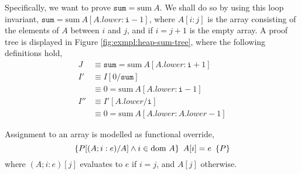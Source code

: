 \begin{example}
  Specifically, we want to prove $\mathtt{sum} = \mathrm{sum}~A$. We
  shall do so by using this loop invariant, $\mathtt{sum} =
  \mathrm{sum}~A[A.lower : \mathtt{i} - 1]$, where $A[i:j]$ is the
  array consisting of the elements of $A$ between $i$ and $j$, and if
  $i = j + 1$ is the empty array. A proof tree is displayed in Figure
  \ref{fig:exmpl:heap-sum-tree}, where the following definitions hold,
  \begin{align*}
    J &\equiv \mathtt{sum} = \mathrm{sum}~A[A.lower : \mathtt{i} + 1]\\
    I' &\equiv I[0/\mathtt{sum}]\\
    &\equiv 0 = \mathrm{sum}~A[A.lower : \mathtt{i} - 1]\\
    I'' &\equiv I'[A.lower/\mathtt{i}]\\
    &\equiv 0 = \mathrm{sum}~A[A.lower : A.lower - 1]
  \end{align*}
\end{example}

\begin{definition}
  Assignment to an array is modelled as functional override,
  \[\left\{P[(A; i : e)/A] \land i \in \mathrm{dom}~A\right\}\ A[i] = e\ \left\{P\right\}\]
  where $(A; i : e)[j]$ evaluates to $e$ if $i = j$, and $A[j]$
  otherwise.
\end{definition}

